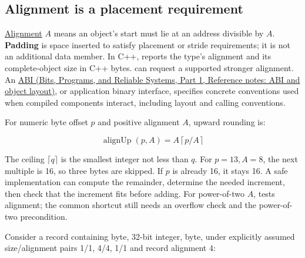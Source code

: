 \subsection{Alignment is a placement requirement}\label{01-foundations-i-ch002-alignment-is-a-placement-requirement}

\hypertarget{01-foundations-i-ch002-alignment-is-a-placement-requirement}{}

\hyperref[appendix-a1f7c53b4742]{Alignment} \(A\) means an object's start must lie at an address divisible by \(A\). \textbf{Padding} is space inserted to satisfy placement or stride requirements; it is not an additional data member. In C++,  reports the type's alignment and  its complete-object size in C++ bytes.  can request a supported stronger alignment. An \href{../01-Bits-Programs-and-Reliable-Systems-P01/main.pdf\#nameddest=appendix-c4ac6bb0fff8}{ABI (Bits, Programs, and Reliable Systems, Part 1, Reference notes: ABI and object layout)}, or application binary interface, specifies concrete conventions used when compiled components interact, including layout and calling conventions.

For numeric byte offset \(p\) and positive alignment \(A\), upward rounding is:

\[
\operatorname{alignUp}(p,A)=A\left\lceil p/A\right\rceil
\]

The ceiling \(\lceil q\rceil\) is the smallest integer not less than \(q\). For \(p=13,A=8\), the next multiple is 16, so three bytes are skipped. If \(p\) is already 16, it stays 16. A safe implementation can compute the remainder, determine the needed increment, then check that the increment fits before adding. For power-of-two \(A\),  tests alignment; the common  shortcut still needs an overflow check and the power-of-two precondition.

Consider a record containing byte, 32-bit integer, byte, under explicitly assumed size/alignment pairs 1/1, 4/4, 1/1 and record alignment 4:

